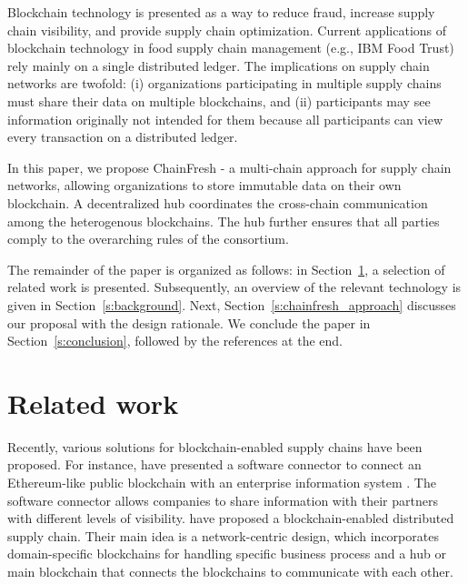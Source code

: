 \documentclass[conference]{IEEEtran}
\begin{document}
Blockchain technology is presented as a way to reduce fraud, increase supply chain visibility, and provide supply chain optimization. Current applications of blockchain technology in food supply chain management (e.g., IBM Food Trust) rely mainly on a single distributed ledger. The implications on supply chain networks are twofold: (i) organizations participating in multiple supply chains must share their data on multiple blockchains, and (ii) participants may see information originally not intended for them because all participants can view every transaction on a distributed ledger. 

In this paper, we propose ChainFresh - a multi-chain approach for supply chain networks, allowing organizations to store immutable data on their own blockchain. A decentralized hub coordinates the cross-chain communication among the heterogenous blockchains.  The hub further ensures that all parties comply to the overarching rules of the consortium. 

The remainder of the paper is organized as follows: in Section~\ref{s:related_work}, a selection of related work is presented. Subsequently, an overview of the relevant technology is given in Section~\ref{s:background}. Next, Section~\ref{s:chainfresh_approach} discusses our proposal with the design rationale. We conclude the paper in Section~\ref{s:conclusion}, followed by the references at the end. 

\section{Related work} \label{s:related_work}
Recently, various solutions for blockchain-enabled supply chains have been proposed. For instance, \citeauthor{longo2019blockchain} have presented a software connector to connect an Ethereum-like public blockchain with an enterprise information system \cite{longo2019blockchain}. The software connector allows companies to share information with their partners with different levels of visibility. \citeauthor{schulz2018multichain} \cite{schulz2018multichain} have proposed a blockchain-enabled distributed supply chain. Their main idea is a network-centric design, which incorporates domain-specific blockchains for handling specific business process and a hub or main blockchain that connects the blockchains to communicate with each other. 
\end{document}
